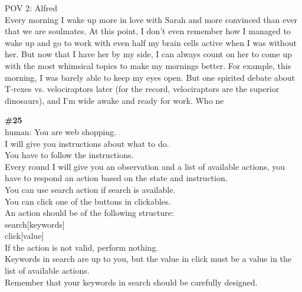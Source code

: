 \documentclass[10pt]{article}
\begin{document}
\begin{Form}
\begin{tcolorbox}[colback=convbg,colframe=itemframe,boxrule=0.8pt,arc=2pt,breakable,left=6pt,right=6pt,top=5pt,bottom=5pt]
{POV 2: Alfred \\[2pt]
Every morning I wake up more in love with Sarah and more convinced than ever that we are soulmates. At this point, I don't even remember how I managed to wake up and go to work with even half my brain cells active when I was without her. But now that I have her by my side, I can always count on her to come up with the most whimsical topics to make my mornings better. For example, this morning, I was barely able to keep my eyes open. But one spirited debate about T-rexes vs. velociraptors later (for the record, velociraptors are the superior dinosaurs), and I'm wide awake and ready for work. Who ne}
\end{tcolorbox}
\vspace{-1pt}
\CheckBox[name=q24c,width=1.6ex,height=1.6ex,bordercolor={0.45 0.45 0.45}]{~\textcolor{cbox}{COMPACT}}\quad
\CheckBox[name=q24d,width=1.6ex,height=1.6ex,bordercolor={0.45 0.45 0.45}]{~\textcolor{dbox}{DIFFUSE}}\quad
\CheckBox[name=q24n,width=1.6ex,height=1.6ex,bordercolor={0.45 0.45 0.45}]{~\textcolor{nbox}{NONE}}
\vspace{8pt}
\begin{tcolorbox}[colback=convbg,colframe=itemframe,boxrule=0.8pt,arc=2pt,breakable,left=6pt,right=6pt,top=5pt,bottom=5pt]
{\footnotesize\textbf{\#25}}\\[3pt]
{\footnotesize human: You are web shopping. \\[2pt]
I will give you instructions about what to do. \\[2pt]
You have to follow the instructions. \\[2pt]
Every round I will give you an observation and a list of available actions, you have to respond an action based on the state and instruction. \\[2pt]
You can use search action if search is available. \\[2pt]
You can click one of the buttons in clickables. \\[2pt]
An action should be of the following structure: \\[2pt]
search[keywords] \\[2pt]
click[value] \\[2pt]
If the action is not valid, perform nothing. \\[2pt]
Keywords in search are up to you, but the value in click must be a value in the list of available actions. \\[2pt]
Remember that your keywords in search should be carefully designed. \\[2pt]
}
\end{tcolorbox}
\end{Form}
\end{document}
